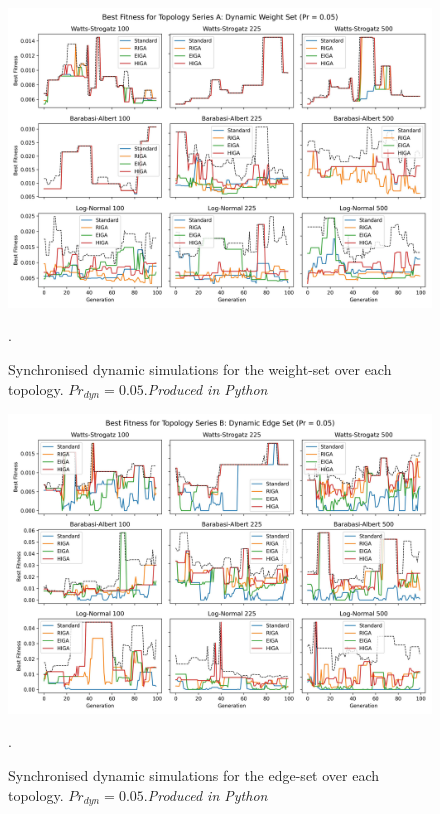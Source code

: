 \documentclass[
	a4paper, %
	10pt, %
	unnumberedsections, %
	twoside, %
]{LTJournalArticle}
\begin{document}
 \begin{figure}
	\includegraphics[width=\linewidth]{Figures/sims/dynamic/series_a_weight_sync.jpg}
	\caption{Synchronised dynamic simulations for the weight-set over each topology. \(Pr_{dyn} = 0.05\).\emph{Produced in Python}}. 
	\label{fig:dynamic_7}
\end{figure}

 \begin{figure}
	\includegraphics[width=\linewidth]{Figures/sims/dynamic/series_b_edge_sync.jpg}
	\caption{Synchronised dynamic simulations for the edge-set over each topology. \(Pr_{dyn} = 0.05\).\emph{Produced in Python}}. 
	\label{fig:dynamic_8}
\end{figure}
\end{document}
